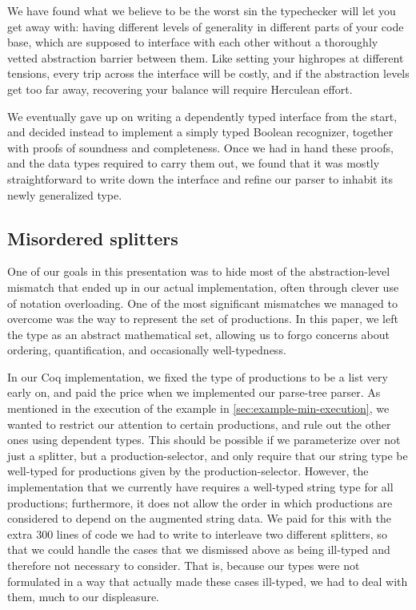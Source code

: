 \documentclass[preprint]{sigplanconf}
\begin{document}
    We have found what we believe to be the worst sin the typechecker will let you get away with: having different levels of generality in different parts of your code base, which are supposed to interface with each other without a thoroughly vetted abstraction barrier between them.  Like setting your highropes at different tensions, every trip across the interface will be costly, and if the abstraction levels get too far away, recovering your balance will require Herculean effort.

    We eventually gave up on writing a dependently typed interface from the start, and decided instead to implement a simply typed Boolean recognizer, together with proofs of soundness and completeness.  Once we had in hand these proofs, and the data types required to carry them out, we found that it was mostly straightforward to write down the interface and refine our parser to inhabit its newly generalized type.

  \subsection{Misordered splitters} \label{sec:misordered-splitters}
    One of our goals in this presentation was to hide most of the abstraction-level mismatch that ended up in our actual implementation, often through clever use of notation overloading.  One of the most significant mismatches we managed to overcome was the way to represent the set of productions.  In this paper, we left the type as an abstract mathematical set, allowing us to forgo concerns about ordering, quantification, and occasionally well-typedness.

    In our Coq implementation, we fixed the type of productions to be a list very early on, and paid the price when we implemented our parse-tree parser.  As mentioned in the execution of the example in \autoref{sec:example-min-execution}, we wanted to restrict our attention to certain productions, and rule out the other ones using dependent types.  This should be possible if we parameterize over not just a splitter, but a production-selector, and only require that our string type be well-typed for productions given by the production-selector.  However, the implementation that we currently have requires a well-typed string type for all productions; furthermore, it does not allow the order in which productions are considered to depend on the augmented string data.  We paid for this with the extra 300 lines of code we had to write to interleave two different splitters, so that we could handle the cases that we dismissed above as being ill-typed and therefore not necessary to consider.  That is, because our types were not formulated in a way that actually made these cases ill-typed, we had to deal with them, much to our displeasure.
\end{document}
